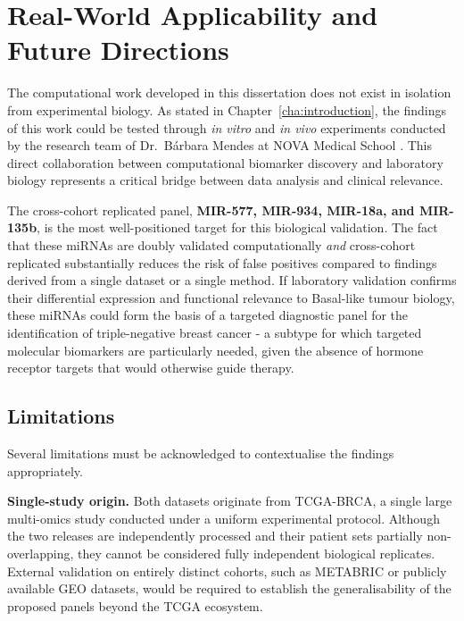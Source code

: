 \section{Real-World Applicability and Future Directions}
\label{sec:disc_applications}
 
The computational work developed in this dissertation does not exist in isolation
from experimental biology. As stated in Chapter~\ref{cha:introduction}, the findings
of this work could be tested through \textit{in vitro} and \textit{in vivo} experiments
conducted by the research team of Dr.\ Bárbara Mendes at NOVA Medical School
\cite{_Mendes2022Nanodelivery}. This direct collaboration between computational
biomarker discovery and laboratory biology represents a critical bridge between data
analysis and clinical relevance.
 
The cross-cohort replicated panel, \textbf{MIR-577, MIR-934, MIR-18a, and
MIR-135b}, is the most well-positioned target for this biological validation.
The fact that these miRNAs are doubly validated computationally \textit{and}
cross-cohort replicated substantially reduces the risk of false positives compared
to findings derived from a single dataset or a single method. If laboratory
validation confirms their differential expression and functional relevance to
Basal-like tumour biology, these miRNAs could form the basis of a targeted
diagnostic panel for the identification of triple-negative breast cancer - a
subtype for which targeted molecular biomarkers are particularly needed, given the
absence of hormone receptor targets that would otherwise guide therapy.

 
\subsection{Limitations}
\label{subsec:disc_limitations}
 
Several limitations must be acknowledged to contextualise the findings appropriately.
 
\textbf{Single-study origin.} Both datasets originate from TCGA-BRCA, a single large
multi-omics study conducted under a uniform experimental protocol. Although the two
releases are independently processed and their patient sets partially non-overlapping,
they cannot be considered fully independent biological replicates. External validation
on entirely distinct cohorts, such as METABRIC \cite{bc_molecular_Perou2000} or
publicly available GEO datasets, would be required to establish the generalisability
of the proposed panels beyond the TCGA ecosystem.
 
